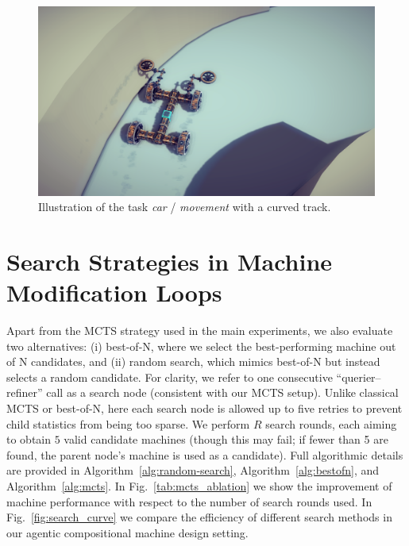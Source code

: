 \begin{figure}[h!]
  \centering
  \includegraphics[width=\linewidth]{figures/tasks/curved_track.png}
  \caption{\footnotesize Illustration of the task \textit{car} / \textit{movement} with a curved track.}
  \label{fig:task_curved_track}
\end{figure}











\clearpage
\newpage

\section{Search Strategies in Machine Modification Loops}



Apart from the MCTS strategy used in the main experiments, we also evaluate two alternatives: (i) best-of-N, where we select the best-performing machine out of N candidates, and (ii) random search, which mimics best-of-N but instead selects a random candidate. For clarity, we refer to one consecutive ``querier–refiner'' call as a search node (consistent with our MCTS setup). Unlike classical MCTS or best-of-N, here each search node is allowed up to five retries to prevent child statistics from being too sparse. We perform $R$ search rounds, each aiming to obtain $5$ valid candidate machines (though this may fail; if fewer than 5 are found, the parent node’s machine is used as a candidate). Full algorithmic details are provided in Algorithm~\ref{alg:random-search}, Algorithm~\ref{alg:bestofn}, and Algorithm~\ref{alg:mcts}. In Fig.~\ref{tab:mcts_ablation} we show the improvement of machine performance with respect to the number of search rounds used. In Fig.~\ref{fig:search_curve} we compare the efficiency of different search methods in our agentic compositional machine design setting.



